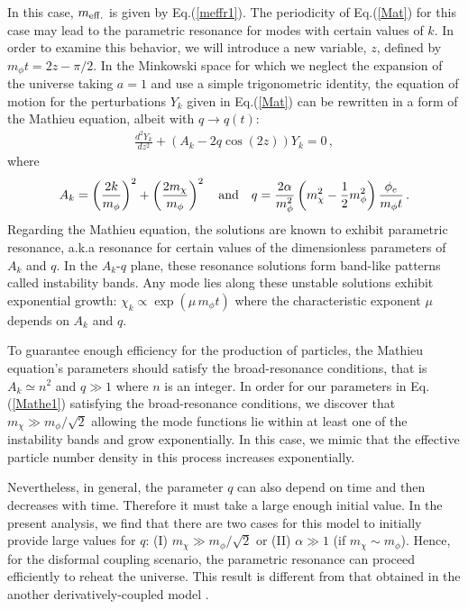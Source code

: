 \documentclass[aps,prd,amsmath,amssymb,preprintnumbers,onecolumn,11pt,nofootinbib]{revtex4}
\begin{document}
In this case, $m_{\rm eff.}$ is given by Eq.(\ref{meffr1}). The periodicity of Eq.(\ref{Mat}) for this case may lead to the parametric resonance for modes with certain values of $k$. In order to examine this behavior, we will introduce a new variable, $z$, defined by $m_{\phi}t=2z - \pi/2$. In the Minkowski space for which we neglect the expansion of the universe taking $a=1$ and use a simple trigonometric identity, the equation of motion for the perturbations $Y_{k}$ given in Eq.(\ref{Mat}) can be rewritten in a form of the Mathieu equation, albeit with $q\rightarrow q(t)$:
\begin{eqnarray}
\frac{d^{2}Y_{k}}{dz^{2}} + \left(A_{k} -2q\cos(2z)\right)Y_{k} = 0\,,
\label{Mathe}
\end{eqnarray}
where
\begin{eqnarray}
A_{k} = \left(\frac{2k}{m_{\phi}}\right)^{2} + \left(\frac{2m_{\chi}}{m_{\phi}}\right)^{2}\quad{\rm and}\quad 
q = \frac{2\alpha}{m^{2}_{\phi}}\left(m^{2}_{\chi} - \frac{1}{2}m^{2}_{\phi}\right)\frac{\phi_{e}}{m_{\phi}t}\,.
\label{Mathe1}
\end{eqnarray}
Regarding the Mathieu equation, the solutions are known to exhibit parametric resonance, a.k.a resonance for certain values of the dimensionless parameters of $A_{k}$ and $q$. In the $A_{k}$-$q$ plane, these resonance solutions form band-like patterns called instability bands. Any mode lies along these unstable solutions exhibit exponential growth: $\chi_{k}\propto \exp(\mu\,m_{\phi} t)$ where the characteristic exponent $\mu$ depends on $A_{k}$ and $q$.

To guarantee enough efficiency for the production of particles, the Mathieu equation's parameters should satisfy the broad-resonance conditions, that is $A_{k}\simeq n^{2}$ and $q\gg 1$ where $n$ is an integer. In order for our parameters in Eq.(\ref{Mathe1}) satisfying the broad-resonance conditions, we discover that $m_{\chi}\gg m_{\phi}/\sqrt{2}$ allowing the mode functions lie within at least one of the instability bands and grow exponentially. In this case, we mimic that the effective particle number density in this process increases exponentially. 

Nevertheless, in general, the parameter $q$ can also depend on time and then decreases with time. Therefore it must take a large enough initial value. In the present analysis, we find that there are two cases for this model to initially provide large values for $q$: (I) $m_{\chi}\gg m_{\phi}/\sqrt{2}$ or (II) $\alpha\gg 1$ (if $m_{\chi}\sim m_{\phi}$). Hence, for the disformal coupling scenario, the parametric resonance can proceed efficiently to reheat the universe. This result is different from that obtained in the another derivatively-coupled model \cite{ArmendarizPicon:2007iv}.
\end{document}
